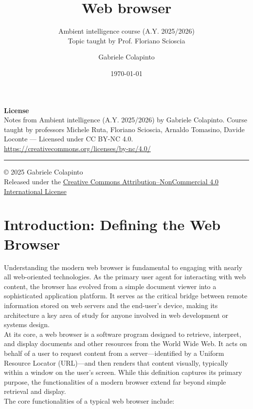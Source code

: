 \documentclass{scrbook}
\title{Web browser}
\subtitle{Ambient intelligence course (A.Y. 2025/2026)\\Topic taught by Prof. Floriano Scioscia}
\author{Gabriele Colapinto}
\date{\today}
\begin{document}
\maketitle
\thispagestyle{empty}

{\Large\textbf{License}} \\
{Notes from Ambient intelligence (A.Y. 2025/2026) by Gabriele Colapinto. 
Course taught by professors Michele Ruta, Floriano Scioscia, Arnaldo Tomasino, Davide Loconte — 
Licensed under CC BY-NC 4.0.\\
\url{https://creativecommons.org/licenses/by-nc/4.0/}}

\vspace*{\fill}
\rule{\textwidth}{0.2pt}
\small{© 2025 Gabriele Colapinto \\
Released under the \href{https://creativecommons.org/licenses/by-nc/4.0/}{Creative Commons Attribution–NonCommercial 4.0 International License}}

\clearpage

\tableofcontents

\chapter{Introduction: Defining the Web Browser}

Understanding the modern web browser is fundamental to engaging with nearly all web-oriented technologies. As the primary user agent for interacting with web content, the browser has evolved from a simple document viewer into a sophisticated application platform. It serves as the critical bridge between remote information stored on web servers and the end-user's device, making its architecture a key area of study for anyone involved in web development or systems design. \\

At its core, a web browser is a software program designed to retrieve, interpret, and display documents and other resources from the World Wide Web. It acts on behalf of a user to request content from a server—identified by a Uniform Resource Locator (URL)—and then renders that content visually, typically within a window on the user's screen. While this definition captures its primary purpose, the functionalities of a modern browser extend far beyond simple retrieval and display. \\

The core functionalities of a typical web browser include:
\end{document}
